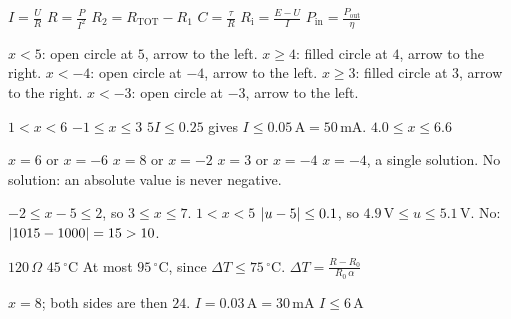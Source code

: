 \begin{facit}
  $I = \frac{U}{R}$  $R = \frac{P}{I^2}$  $R_2 = R_{\text{TOT}} - R_1$
 $C = \frac{\tau}{R}$  $R_{\text{i}} = \frac{E - U}{I}$
 $P_{\text{in}} = \frac{P_{\text{out}}}{\eta}$

  $x < 5$: open circle at $5$, arrow to the left.
 $x \geq 4$: filled circle at $4$, arrow to the right.
 $x < -4$: open circle at $-4$, arrow to the left.
 $x \geq 3$: filled circle at $3$, arrow to the right.
 $x < -3$: open circle at $-3$, arrow to the left.

  $1 < x < 6$  $-1 \leq x \leq 3$
 $5I \leq 0.25$ gives $I \leq 0.05\,\text{A} = 50\,\text{mA}$.
 $4.0 \leq x \leq 6.6$

  $x = 6$ or $x = -6$  $x = 8$ or $x = -2$
 $x = 3$ or $x = -4$  $x = -4$, a single solution.
 No solution: an absolute value is never negative.

  $-2 \leq x - 5 \leq 2$, so $3 \leq x \leq 7$.  $1 < x < 5$
 $\lvert u - 5\rvert \leq 0.1$, so $4.9\,\text{V} \leq u \leq 5.1\,\text{V}$.
 No: $\lvert1015 - 1000\rvert = 15 > 10$.

  $120\,\Omega$  $45\,{}^{\circ}\text{C}$
 At most $95\,{}^{\circ}\text{C}$, since $\Delta T \leq 75\,{}^{\circ}\text{C}$.
 $\Delta T = \frac{R - R_0}{R_0\,\alpha}$

  $x = 8$; both sides are then $24$.
 $I = 0.03\,\text{A} = 30\,\text{mA}$  $I \leq 6\,\text{A}$

\end{facit}
